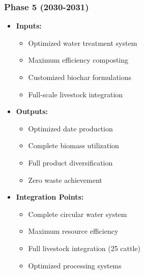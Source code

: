 \subsubsection{Phase 5 (2030-2031)}
\begin{itemize}
    \item \textbf{Inputs:}
    \begin{itemize}
        \item Optimized water treatment system
        \item Maximum efficiency composting
        \item Customized biochar formulations
        \item Full-scale livestock integration
    \end{itemize}
    \item \textbf{Outputs:}
    \begin{itemize}
        \item Optimized date production
        \item Complete biomass utilization
        \item Full product diversification
        \item Zero waste achievement
    \end{itemize}
    \item \textbf{Integration Points:}
    \begin{itemize}
        \item Complete circular water system
        \item Maximum resource efficiency
        \item Full livestock integration (25 cattle)
        \item Optimized processing systems
    \end{itemize}
\end{itemize}

